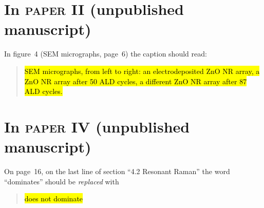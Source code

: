 \documentclass[webedition,titles,swedish,english]{LuaUUThesis}\usepackage[]{graphicx}\usepackage[]{xcolor}
\begin{document}
\section*{In \textbf{\textsc{paper II}} (unpublished manuscript)}

In figure~4 (SEM micrographs, page~6) the caption should read:
\blockquote{\hl{%
   SEM micrographs, from left to right:
   an electrodeposited ZnO NR array,
   a ZnO NR array after 50 ALD cycles,
   a different ZnO NR array after 87 ALD cycles.}}



\section*{In \textbf{\textsc{paper IV}} (unpublished manuscript)}


On page~16, on the last line of section \enquote{4.2 Resonant Raman} the
word \enquote{dominates} should be \emph{replaced} with
\blockquote{\hl{does not dominate}}.




\backmatter

\printbibliography[%
   title=References,%
   heading=bibintoc%
]
\end{document}
